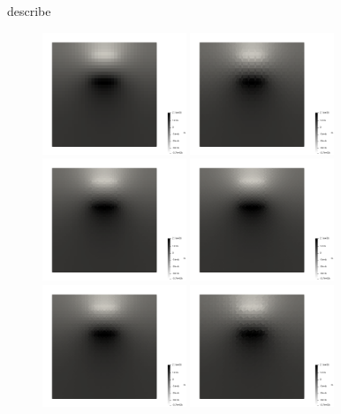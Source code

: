 \documentclass[a4paper,12pt]{article}
\begin{document}
{\color{red} describe}

\begin{figure}[t]
\centering
\includegraphics[width=4.3cm]{../results/exp08/fig16x16_reduced/press.0000.png}
\includegraphics[width=4.3cm]{../results/exp08/fig16x16_reduced/press.0001.png}
\includegraphics[width=4.3cm]{../results/exp08/fig16x16_reduced/press.0002.png}
\includegraphics[width=4.3cm]{../results/exp08/fig16x16_reduced/press.0003.png}
\includegraphics[width=4.3cm]{../results/exp08/fig16x16_reduced/press.0004.png}
\includegraphics[width=4.3cm]{../results/exp08/fig16x16_reduced/press.0005.png}

\end{figure}
\end{document}
